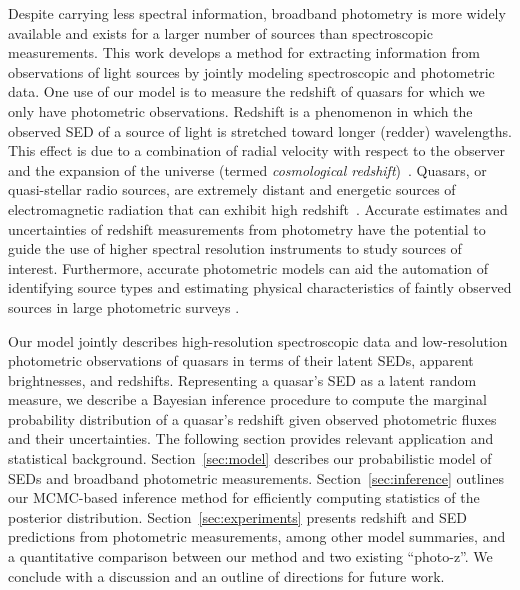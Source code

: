 \documentclass{article} %
\begin{document}
Despite carrying less spectral information, broadband photometry is more widely available and exists for a larger number of sources than spectroscopic measurements. 
This work develops a method for extracting information from observations of light sources by jointly modeling spectroscopic and photometric data.  
One use of our model is to measure the redshift of quasars for which we only have photometric observations.  
Redshift is a phenomenon in which the observed SED of a source of light is stretched toward longer (redder) wavelengths.
This effect is due to a combination of radial velocity with respect to the observer and the expansion of the universe (termed \emph{cosmological redshift})~\cite{hogg1999distance, harrison1993redshift}.  
Quasars, or quasi-stellar radio sources, are extremely distant and energetic sources of electromagnetic radiation that can exhibit high redshift~\cite{silk1997quasars}.  
Accurate estimates and uncertainties of redshift measurements from photometry have the potential to guide the use of higher spectral resolution instruments to study sources of interest.  
Furthermore, accurate photometric models can aid the automation of identifying source types and estimating physical characteristics of faintly observed sources in large photometric surveys \cite{regier2015}.  

Our model jointly describes high-resolution spectroscopic data and low-resolution photometric observations of quasars in terms of their latent SEDs, apparent brightnesses, and redshifts. 
Representing a quasar's SED as a latent random measure, we describe a Bayesian inference procedure to compute the marginal probability distribution of a quasar's redshift given observed photometric fluxes and their uncertainties.  
The following section provides relevant application and statistical background.  
Section~\ref{sec:model} describes our probabilistic model of SEDs and broadband photometric measurements.
Section~\ref{sec:inference} outlines our MCMC-based inference method for efficiently computing statistics of the posterior distribution.
Section~\ref{sec:experiments} presents redshift and SED predictions from photometric measurements, among other model summaries, and a quantitative comparison between our method and two existing ``photo-z''.  
We conclude with a discussion and an outline of directions for future work.  
\end{document}
